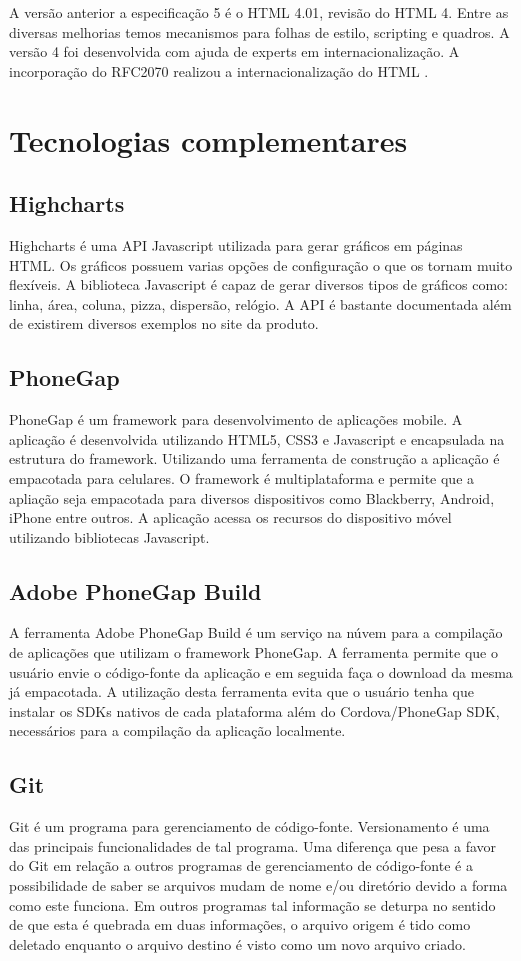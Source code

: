 A versão anterior a especificação 5 é o HTML 4.01, revisão do HTML 4. Entre as diversas melhorias temos mecanismos para folhas de estilo, scripting e quadros. A versão 4 foi desenvolvida com ajuda de experts em internacionalização. A incorporação do RFC2070 realizou a internacionalização do HTML \cite{html4Int}.

\chapter{Tecnologias complementares}

\section{Highcharts}
Highcharts é uma API Javascript utilizada para gerar gráficos em páginas HTML. Os gráficos possuem varias opções de configuração o que os tornam muito flexíveis. A biblioteca Javascript é capaz de gerar diversos tipos de gráficos como: linha, área, coluna, pizza, dispersão, relógio. A API é bastante documentada além de existirem diversos exemplos no site da produto.

\section{PhoneGap}
PhoneGap é um framework para desenvolvimento de aplicações mobile. A aplicação é desenvolvida utilizando HTML5, CSS3 e Javascript e encapsulada na estrutura do framework. Utilizando uma ferramenta de construção a aplicação é empacotada para celulares. O framework é multiplataforma e permite que a apliação seja empacotada para diversos dispositivos como Blackberry, Android, iPhone entre outros. A aplicação acessa os recursos do dispositivo móvel utilizando bibliotecas Javascript.

\section{Adobe PhoneGap Build}
A ferramenta Adobe PhoneGap Build é um serviço na núvem para a compilação de aplicações que utilizam o framework PhoneGap. A ferramenta permite que o usuário envie o código-fonte da aplicação e em seguida faça o download da mesma já empacotada. A utilização desta ferramenta evita que o usuário tenha que instalar os SDKs nativos de cada plataforma além do Cordova/PhoneGap SDK, necessários para a compilação da aplicação localmente.

\section{Git}
Git é um programa para gerenciamento de código-fonte. Versionamento é uma das principais funcionalidades de tal programa. Uma diferença que pesa a favor do Git em relação a outros programas de gerenciamento de  código-fonte é a possibilidade de saber se arquivos mudam de nome e/ou diretório devido a forma como este funciona. Em outros programas tal informação se deturpa no sentido de que esta é quebrada em duas informações, o arquivo origem é tido como deletado enquanto o arquivo destino é visto como um novo arquivo criado.

